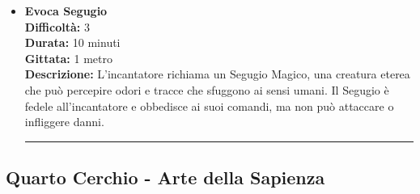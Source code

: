 \documentclass[./magie.tex]{subfiles}
\begin{document}
\begin{itemize}
\vspace{0.2cm}
\noindent
\begin{center}
\rule{\textwidth}{0.4pt} 
\end{center}
\vspace{0.2cm}

\item \textbf{Evoca Segugio} \\
\textbf{Difficoltà:} 3 \\
\textbf{Durata:} 10 minuti \\
\textbf{Gittata:} 1 metro \\
\textbf{Descrizione:} L'incantatore richiama un Segugio Magico, una creatura eterea che può percepire odori e tracce che sfuggono ai sensi umani. Il Segugio è fedele all'incantatore e obbedisce ai suoi comandi, ma non può attaccare o infliggere danni.

\vspace{0.2cm}
\noindent
\begin{center}
\rule{\textwidth}{0.4pt} 
\end{center}
\vspace{0.2cm}

\end{itemize}

\clearpage
 \subsection*{Quarto Cerchio - Arte della Sapienza}
\end{document}
